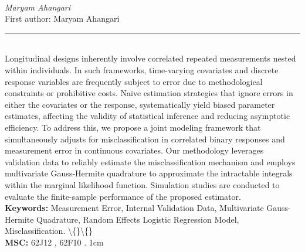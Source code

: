 \documentclass[10pt,twoside]{article}
\begin{document}
\noindent\begin{minipage}[t][\textheight]{\textwidth}
\\[0.35em]
{\itshape Maryam Ahangari}\\[0.2em]
{\footnotesize First author: Maryam Ahangari}\\[0.45em]
\noindent\rule{\textwidth}{0.3pt}\\[0.4em]
{\footnotesize  Longitudinal designs inherently involve correlated repeated measurements nested within individuals. In such frameworks, time-varying covariates and discrete response variables are frequently subject to error due to methodological constraints or prohibitive costs. Naive estimation strategies that ignore errors in either the covariates or the response, systematically yield biased parameter estimates, affecting the validity of statistical inference and reducing asymptotic efficiency. To address this, we propose a joint modeling framework that simultaneously adjusts for misclassification in correlated binary responses and measurement error in continuous covariates. Our methodology leverages validation data to reliably estimate the misclassification mechanism and employs multivariate Gauss-Hermite quadrature to approximate the intractable integrals within the marginal likelihood function. Simulation studies are conducted to evaluate the finite-sample performance of the proposed estimator.}\\[0.4em]
{\footnotesize\bfseries Keywords:} {\footnotesize Measurement Error, Internal Validation Data, Multivariate Gauss-Hermite Quadrature, Random Effects Logistic Regression Model, Misclassification. \textbackslash\{\}\textbackslash\{\}}\\[0.15em]
{\footnotesize\bfseries MSC:} {\footnotesize 62J12 , 62F10 . 1cm}\\
\vfill
\end{minipage}
\newpage
\end{document}
